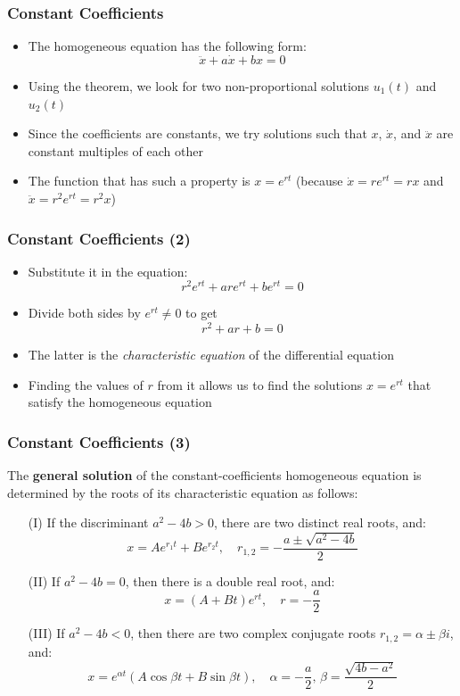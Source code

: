 \documentclass[10pt,usenames,dvipsnames]{beamer}
\theoremstyle{definition}
\begin{document}
\begin{frame}[fragile]
\frametitle{Constant Coefficients}
\begin{itemize}
	\item The homogeneous equation has the following form:
	\[
		\ddot{x} + a\dot{x} + bx = 0
	\]
	\item Using the theorem, we look for two non-proportional solutions $u_{1}(t)$ and $u_{2}(t)$
	\item Since the coefficients are constants, we try solutions such that $x$, $\dot{x}$, and $\ddot{x}$ are constant multiples of each other
	\item The function that has such a property is $x = e^{rt}$ (because $\dot{x} = re^{rt} = rx$ and $\ddot{x} = r^{2}e^{rt} = r^{2}x$)
\end{itemize}
\end{frame}

\begin{frame}[fragile]
\frametitle{Constant Coefficients (2)}
\begin{itemize}
	\item Substitute it in the equation:
	\[
		r^{2}e^{rt} + are^{rt} + be^{rt} = 0
	\]
	\item Divide both sides by $e^{rt} \neq 0$ to get
	\[
		r^{2} + ar + b = 0
	\]
	\item The latter is the \textit{characteristic equation} of the differential equation
	\item Finding the values of $r$ from it allows us to find the solutions $x = e^{rt}$ that satisfy the homogeneous equation
\end{itemize}
\end{frame}

\begin{frame}[fragile]
\frametitle{Constant Coefficients (3)}
\begin{theorem}
	The \textbf{general solution} of the constant-coefficients homogeneous equation is determined by the roots of its characteristic equation as follows:
	\begin{enumerate}
		\item[(I)] If the discriminant $a^{2} - 4b > 0$, there are two distinct real roots, and:
		\[
			x = Ae^{r_{1}t} + Be^{r_{2}t}, \quad r_{1,2} = -\dfrac{a \pm \sqrt{a^{2} - 4b}}{2}  
		\]
		\item[(II)] If $a^{2} - 4b = 0$, then there is a double real root, and:
		\[
			x = (A + Bt)e^{rt}, \quad r = -\dfrac{a}{2}
		\]
		\item[(III)] If $a^{2} - 4b < 0$, then there are two complex conjugate roots $r_{1,2} = \alpha \pm \beta i$, and:
		\[
			x = e^{\alpha t}(A\cos \beta t + B\sin \beta t),\quad \alpha = -\dfrac{a}{2}, \, \beta = \dfrac{\sqrt{4b - a^{2}}}{2}
		\]
	\end{enumerate}
\end{theorem}
\end{frame}
\end{document}
